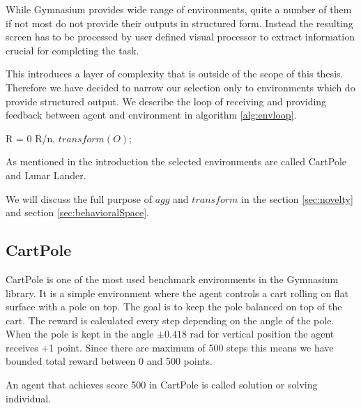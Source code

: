 While Gymnasium provides wide range of environments, quite a number of them if not most do not provide their outputs in structured form. Instead the resulting screen has to be processed by user defined visual processor to extract information crucial for completing the task. 

This introduces a layer of complexity that is outside of the scope of this thesis. Therefore we have decided to narrow our selection only to environments which do provide structured output. We describe the loop of receiving and providing feedback between agent and environment in algorithm \ref{alg:envloop}.
\begin{algorithm}[h]
	\caption{Environment Interaction Loop}
	\label{alg:envloop}
	
	R = 0\;
	\Return R/n, $ transform(O) $;
	
\end{algorithm}


 As mentioned in the introduction the selected environments are called CartPole and Lunar Lander. 
 
 We will discuss the full purpose of $ agg $ and $ transform $ in the section \ref{sec:novelty} and section \ref{sec:behavioralSpace}.

\subsection{CartPole}
\label{env:cartpole}

CartPole is one of the most used benchmark environments in the Gymnasium library. It is a simple environment where the agent controls a cart rolling on flat surface with a pole on top.
The goal is to keep the pole balanced on top of the cart. The reward is calculated every step depending on the angle of the pole. When the pole is kept in the angle $\pm0.418\text{ rad}$ for vertical position the agent receives +1 point.  Since there are maximum of 500 steps this means we have bounded total reward between 0 and 500 points.
\begin{defn}
	An agent that achieves score 500 in CartPole is called solution or solving individual.
\end{defn}

